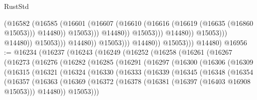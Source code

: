 \begin{lexlean}{RustStd}
\begin{coremodule}
                                                      (@16582
                                                        (@16585
                                                          (@16601
                                                            (@16607
                                                              (@16610
                                                                (@16616
                                                                  (@16619 (@16635 (@16860 @15053)))
                                                                  @14480))
                                                              @15053)))
                                                        @14480))
                                                    @15053)))
                                              @14480))
                                          @15053)))
                                    @14480))
                                @15053)))
                          @14480))
                      @15053)))
                @14480))
            @15053)))
      @14480)
@16956 := @16234
    (@16237
      (@16243
        (@16249
          (@16252
            (@16258
              (@16261
                (@16267
                  (@16273
                    (@16276
                      (@16282
                        (@16285
                          (@16291
                            (@16297
                              (@16300
                                (@16306
                                  (@16309
                                    (@16315
                                      (@16321
                                        (@16324
                                          (@16330
                                            (@16333
                                              (@16339
                                                (@16345
                                                  (@16348
                                                    (@16354
                                                      (@16357
                                                        (@16363
                                                          (@16369
                                                            (@16372
                                                              (@16378
                                                                (@16381
                                                                  (@16397 (@16403 @16908 @15053)))
                                                                @14480))
                                                            @15053)))

\end{coremodule}
\end{lexlean}
